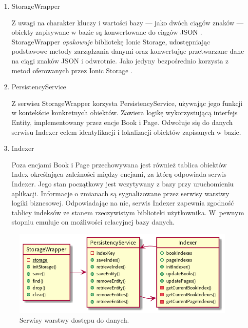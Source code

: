 \begin{enumerate}
	\item StorageWrapper

	      Z uwagi na charakter kluczy i wartości bazy — jako dwóch ciągów znaków — obiekty zapisywane w bazie są
	      konwertowane do ciągów JSON \cite{json}. StorageWrapper \textit{opakowuje} bibliotekę Ionic Storage, udostępniając podstawowe
	      metody zarządzania danymi oraz konwertując przetwarzane dane na ciągi znaków JSON i odwrotnie.
	      Jako jedyny bezpośrednio korzysta z metod oferowanych przez Ionic Storage \cite{storage}.
	\item PersistencyService

	      Z serwisu StorageWrapper korzysta PersistencyService,
	      używając jego funkcji w kontekście konkretnych obiektów.
	      Zawiera logikę wykorzystującą interfejs Entity, implementowany przez encje Book i Page. Odwołuje się do danych
	      serwisu Indexer celem identyfikacji i lokalizacji obiektów zapisanych w bazie.
	\item Indexer

	      Poza encjami Book i Page przechowywana jest również tablica obiektów Index określająca
	      zależności między encjami, za którą odpowiada serwis Indexer.
	      Jego stan początkowy jest wczytywany z bazy przy uruchomieniu aplikacji.
	      Informacje o zmianach są sygnalizowane przez serwisy warstwy logiki biznesowej.
	      Odpowiadając na nie, serwis Indexer zapewnia zgodność tablicy indeksów ze stanem rzeczywistym
	      biblioteki użytkownika. W~pewnym stopniu emuluje on możliwości relacyjnej bazy danych.
\end{enumerate}

\begin{figure}[H]
	\begin{center}
		\includegraphics[scale=0.7]{media/PersistencyLayer.png}
	\end{center}
	\caption{Serwisy warstwy dostępu do danych.}
	\label{rys:persistency-layer}
\end{figure}

